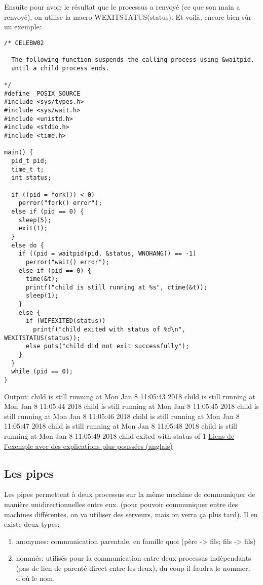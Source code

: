 \documentclass[a4paper]{article}
\begin{document}
Ensuite pour avoir le résultat que le processus a renvoyé (ce que son main a renvoyé), on utilise la macro WEXITSTATUS(status).\newpage
Et voilà, encore bien sûr un exemple:
\begin{lstlisting}
/* CELEBW02

  The following function suspends the calling process using &waitpid.
  until a child process ends.

*/
#define _POSIX_SOURCE
#include <sys/types.h>
#include <sys/wait.h>
#include <unistd.h>
#include <stdio.h>
#include <time.h>

main() {
  pid_t pid;
  time_t t;
  int status;

  if ((pid = fork()) < 0)
    perror("fork() error");
  else if (pid == 0) {
    sleep(5);
    exit(1);
  }
  else do {
    if ((pid = waitpid(pid, &status, WNOHANG)) == -1)
      perror("wait() error");
    else if (pid == 0) {
      time(&t);
      printf("child is still running at %s", ctime(&t));
      sleep(1);
    }
    else {
      if (WIFEXITED(status))
        printf("child exited with status of %d\n", WEXITSTATUS(status));
      else puts("child did not exit successfully");
    }
  }
  while (pid == 0);
}
\end{lstlisting}
Output:\newline
child is still running at Mon Jan 8 11:05:43 2018\newline
child is still running at Mon Jan 8 11:05:44 2018\newline
child is still running at Mon Jan 8 11:05:45 2018\newline
child is still running at Mon Jan 8 11:05:46 2018\newline
child is still running at Mon Jan 8 11:05:47 2018\newline
child is still running at Mon Jan 8 11:05:48 2018\newline
child is still running at Mon Jan 8 11:05:49 2018\newline
child exited with status of 1\newline
\href{https://www.ibm.com/support/knowledgecenter/en/SSLTBW_2.1.0/com.ibm.zos.v2r1.bpxbd00/rtwaip.htm}{Liens de l'exemple avec des explications plus poussées (anglais)}
\subsection{Les pipes}
Les pipes permettent à deux processus sur la même machine de communiquer de manière unidirectionnelles entre eux. (pour pouvoir communiquer entre des machines différentes, on va utiliser des serveurs, mais on verra ça plus tard).\newline
Il en existe deux types:
\begin{enumerate}
  \item anonymes: communication parentale, en famille quoi (père -> fils; fils -> fils)
  \item nommés: utilisés pour la communication entre deux processus indépendants (pas de lien de parenté direct entre les deux), du coup il faudra le nommer, d'où le nom.
\end{enumerate}
\end{document}
